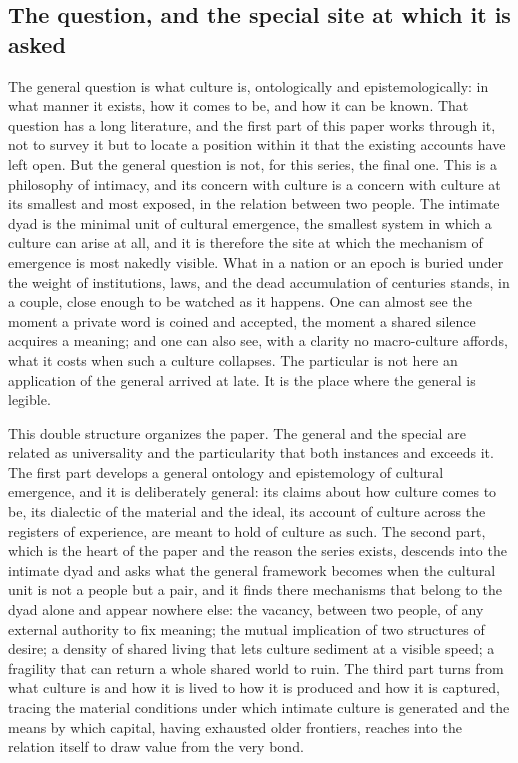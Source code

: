 \subsection*{The question, and the special site at which it is asked}

The general question is what culture is, ontologically and epistemologically: in what manner it exists, how it comes to be, and how it can be known. That question has a long literature, and the first part of this paper works through it, not to survey it but to locate a position within it that the existing accounts have left open. But the general question is not, for this series, the final one. This is a philosophy of intimacy, and its concern with culture is a concern with culture at its smallest and most exposed, in the relation between two people. The intimate dyad is the minimal unit of cultural emergence, the smallest system in which a culture can arise at all, and it is therefore the site at which the mechanism of emergence is most nakedly visible. What in a nation or an epoch is buried under the weight of institutions, laws, and the dead accumulation of centuries stands, in a couple, close enough to be watched as it happens. One can almost see the moment a private word is coined and accepted, the moment a shared silence acquires a meaning; and one can also see, with a clarity no macro-culture affords, what it costs when such a culture collapses. The particular is not here an application of the general arrived at late. It is the place where the general is legible.

This double structure organizes the paper. The general and the special are related as universality and the particularity that both instances and exceeds it. The first part develops a general ontology and epistemology of cultural emergence, and it is deliberately general: its claims about how culture comes to be, its dialectic of the material and the ideal, its account of culture across the registers of experience, are meant to hold of culture as such. The second part, which is the heart of the paper and the reason the series exists, descends into the intimate dyad and asks what the general framework becomes when the cultural unit is not a people but a pair, and it finds there mechanisms that belong to the dyad alone and appear nowhere else: the vacancy, between two people, of any external authority to fix meaning; the mutual implication of two structures of desire; a density of shared living that lets culture sediment at a visible speed; a fragility that can return a whole shared world to ruin. The third part turns from what culture is and how it is lived to how it is produced and how it is captured, tracing the material conditions under which intimate culture is generated and the means by which capital, having exhausted older frontiers, reaches into the relation itself to draw value from the very bond.

